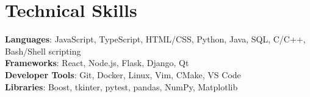 \documentclass[letterpaper,11pt]{article}
\begin{document}
%
\section{Technical Skills}
 \begin{itemize}[leftmargin=0.15in, label={}]
    \small{\item{
     \textbf{Languages}{: JavaScript, TypeScript, HTML/CSS, Python, Java, SQL, C/C++, Bash/Shell scripting} \\
     \textbf{Frameworks}{: React, Node.js, Flask, Django, Qt} \\
     \textbf{Developer Tools}{: Git, Docker, Linux, Vim, CMake, VS Code} \\
     \textbf{Libraries}{: Boost, tkinter, pytest, pandas, NumPy, Matplotlib}
    }}
 \end{itemize}


\end{document}
